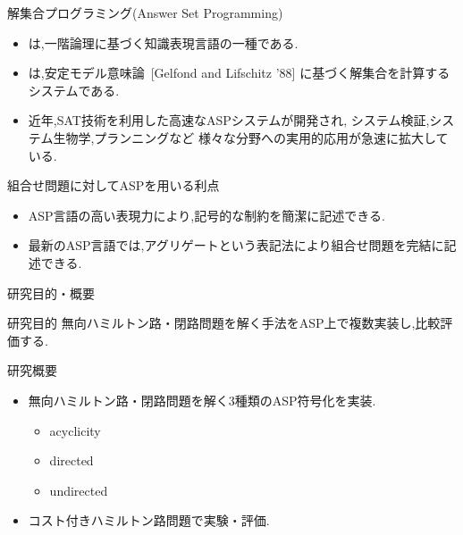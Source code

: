 \documentclass[dvipdfmx,11pt]{beamer}
\begin{document}
\begin{frame}{解集合プログラミング(Answer Set Programming)}
  \begin{itemize}
  \item {}は,一階論理に基づく知識表現言語の一種である.
  \item {}は,安定モデル意味論~[Gelfond and Lifschitz '88]
    に基づく解集合を計算するシステムである.
  \item 近年,SAT技術を利用した高速なASPシステムが開発され,
    システム検証,システム生物学,プランニングなど
    様々な分野への実用的応用が急速に拡大している.
  \end{itemize}
  \begin{alertblock}{組合せ問題に対してASPを用いる利点}
    \begin{itemize}
    \item ASP言語の高い表現力により,記号的な制約を簡潔に記述できる.
    \item 最新のASP言語では,アグリゲートという表記法により組合せ問題を完結に記述できる.
    \end{itemize}
  \end{alertblock}
\end{frame}
\begin{frame}{研究目的・概要}
  \begin{alertblock}{研究目的}
    無向ハミルトン路・閉路問題を解く手法をASP上で複数実装し,比較評価する.
  \end{alertblock}
  \begin{block}{研究概要}
    \begin{itemize}
    \item 無向ハミルトン路・閉路問題を解く3種類のASP符号化を実装.
      \begin{itemize}
      \item acyclicity
      \item directed
      \item undirected
      \end{itemize}
    \item コスト付きハミルトン路問題で実験・評価.
    \end{itemize}
  \end{block}
\end{frame}
\end{document}
